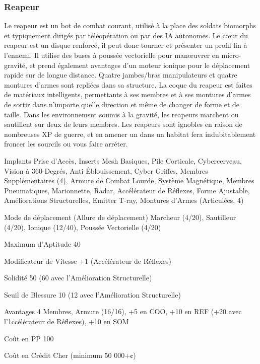 \subsubsection{Reapeur} \label{sec:starting-reaper} 

Le reapeur est un bot de combat courant, utilisé à la place des soldats biomorphs et typiquement dirigés par téléopération ou par des IA autonomes. Le cœur du reapeur est un disque renforcé, il peut donc tourner et présenter un profil fin à l'ennemi. Il utilise des buses à poussée vectorielle pour manœuvrer en micro-gravité, et prend également avantages d'un moteur ionique pour le déplacement rapide sur de longue distance. Quatre jambes/bras manipulateurs et quatre montures d'armes sont repliées dans sa structure. La coque du reapeur est faites de matériaux intelligents, permettants à ses membres et à ses montures d'armes de sortir dans n'importe quelle direction et même de changer de forme et de taille. Dans les environnemsnt soumis à la gravité, les reapeurs marchent ou sautillent sur deux de leurs membres. Les reapeurs sont ignobles en raison de nombreuses XP de guerre, et en amener un dans un habitat fera indubitablement froncer les sourcils ou vous faire arréter. 

\begin{description*} \item[Implants] Prise d'Accès, Inserts Mesh Basiques, Pile Corticale, Cybercerveau, Vision à 360-Degrés, Anti Éblouissement, Cyber Griffes, Membres Supplémentaires (4), Armure de Combat Lourde, Système Magnétique, Membres Pneumatiques, Marionnette, Radar, Accélérateur de Réflexes, Forme Ajustable, Améliorations Structurelles, Emitter T-ray, Montures d'Armes (Articulées, 4) \item[Mode de déplacement](Allure de déplacement) Marcheur (4/20), Sautilleur (4/20), Ionique (12/40), Poussée Vectorielle (4/20)\item[Maximum d'Aptitude] 40 \item[Modificateur de Vitesse] +1 (Accélérateur de Réflexes) \item [Solidité] 50 (60 avec l'Amélioration Structurelle) \item[Seuil de Blessure] 10 (12 avec l'Amélioration Structurelle) \item[Avantages] 4 Membres, Armure (16/16), +5 en COO, +10 en REF (+20 avec l'1ccélérateur de Réflexes), +10 en SOM \item[Coût en PP] 100 \item[Coût en Crédit] Cher (minimum 50 000+¢) \end{description*} 

